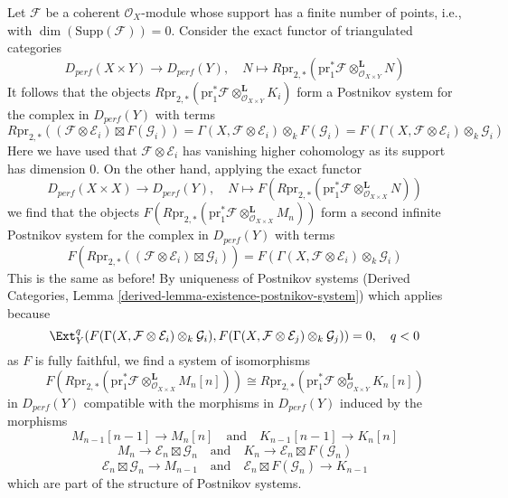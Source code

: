 \medskip\noindent
Let $\mathcal{F}$ be a coherent $\mathcal{O}_X$-module whose support
has a finite number of points, i.e., with $\dim(\text{Supp}(\mathcal{F})) = 0$.
Consider the exact functor of triangulated categories
$$
D_{perf}(X \times Y) \longrightarrow D_{perf}(Y),\quad
N \longmapsto R\text{pr}_{2, *}(\text{pr}_1^*\mathcal{F}
\otimes^\mathbf{L}_{\mathcal{O}_{X \times Y}} N)
$$
It follows that the objects $R\text{pr}_{2, *}(\text{pr}_1^*\mathcal{F}
\otimes^\mathbf{L}_{\mathcal{O}_{X \times Y}} K_i)$
form a Postnikov system for the complex in $D_{perf}(Y)$ with terms
$$
R\text{pr}_{2, *}(
(\mathcal{F} \otimes \mathcal{E}_i) \boxtimes F(\mathcal{G}_i)) =
\Gamma(X, \mathcal{F} \otimes \mathcal{E}_i) \otimes_k F(\mathcal{G}_i) =
F(\Gamma(X, \mathcal{F} \otimes \mathcal{E}_i) \otimes_k \mathcal{G}_i)
$$
Here we have used that $\mathcal{F} \otimes \mathcal{E}_i$ has
vanishing higher cohomology as its support has dimension $0$.
On the other hand, applying the exact functor
$$
D_{perf}(X \times X) \longrightarrow D_{perf}(Y),\quad
N \longmapsto F(R\text{pr}_{2, *}(\text{pr}_1^*\mathcal{F}
\otimes^\mathbf{L}_{\mathcal{O}_{X \times X}} N))
$$
we find that the objects
$F(R\text{pr}_{2, *}(\text{pr}_1^*\mathcal{F}
\otimes^\mathbf{L}_{\mathcal{O}_{X \times X}} M_n))$
form a second infinite Postnikov system
for the complex in $D_{perf}(Y)$ with terms
$$
F(R\text{pr}_{2, *}(
(\mathcal{F} \otimes \mathcal{E}_i) \boxtimes \mathcal{G}_i)) =
F(\Gamma(X, \mathcal{F} \otimes \mathcal{E}_i) \otimes_k \mathcal{G}_i)
$$
This is the same as before! By uniqueness of Postnikov systems
(Derived Categories, Lemma \ref{derived-lemma-existence-postnikov-system})
which applies because
$$
\Ext^q_Y(
F(\Gamma(X, \mathcal{F} \otimes \mathcal{E}_i) \otimes_k \mathcal{G}_i),
F(\Gamma(X, \mathcal{F} \otimes \mathcal{E}_j) \otimes_k \mathcal{G}_j)) = 0,
\quad q < 0
$$
as $F$ is fully faithful, we find a system of isomorphisms
$$
F(R\text{pr}_{2, *}(\text{pr}_1^*\mathcal{F}
\otimes^\mathbf{L}_{\mathcal{O}_{X \times X}} M_n[n]))
\cong
R\text{pr}_{2, *}(\text{pr}_1^*\mathcal{F}
\otimes^\mathbf{L}_{\mathcal{O}_{X \times Y}} K_n[n])
$$
in $D_{perf}(Y)$ compatible with the morphisms in $D_{perf}(Y)$
induced by the morphisms
$$
M_{n - 1}[n - 1] \to M_n[n]
\quad\text{and}\quad
K_{n - 1}[n - 1] \to K_n[n]
$$
$$
M_n \to \mathcal{E}_n \boxtimes \mathcal{G}_n
\quad\text{and}\quad
K_n \to \mathcal{E}_n \boxtimes F(\mathcal{G}_n)
$$
$$
\mathcal{E}_n \boxtimes \mathcal{G}_n \to M_{n - 1}
\quad\text{and}\quad
\mathcal{E}_n \boxtimes F(\mathcal{G}_n) \to K_{n - 1}
$$
which are part of the structure of Postnikov systems.
